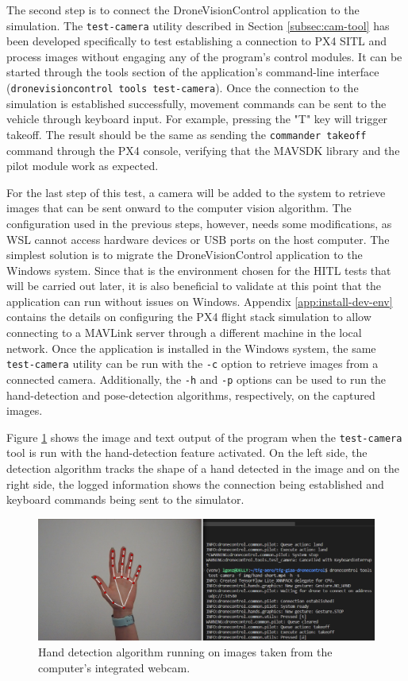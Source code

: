 The second step is to connect the DroneVisionControl application to the simulation.
The \texttt{test-camera} utility described in Section \ref{subsec:cam-tool} has been developed specifically to test establishing a connection to PX4 SITL and process images without engaging any of the program's control modules.
It can be started through the tools section of the application's command-line interface (\texttt{dronevisioncontrol tools test-camera}).
Once the connection to the simulation is established successfully, movement commands can be sent to the vehicle through keyboard input.
For example, pressing the "T" key will trigger takeoff.
The result should be the same as sending the \texttt{commander takeoff} command through the PX4 console, verifying that the MAVSDK library and the pilot module work as expected.



For the last step of this test, a camera will be added to the system to retrieve images that can be sent onward to the computer vision algorithm.
The configuration used in the previous steps, however, needs some modifications, as WSL cannot access hardware devices or USB ports on the host computer.
The simplest solution is to migrate the DroneVisionControl application to the Windows system.
Since that is the environment chosen for the HITL tests that will be carried out later, it is also beneficial to validate at this point that the application can run without issues on Windows.
Appendix \ref{app:install-dev-env} contains the details on configuring the PX4 flight stack simulation to allow connecting to a MAVLink server through a different machine in the local network.
Once the application is installed in the Windows system, the same \texttt{test-camera} utility can be run with the \texttt{-c} option to retrieve images from a connected camera.
Additionally, the \texttt{-h} and \texttt{-p} options can be used to run the hand-detection and pose-detection algorithms, respectively, on the captured images.

Figure \ref{fig:sitl-hand} shows the image and text output of the program when the \texttt{test-camera} tool is run with the hand-detection feature activated.
On the left side, the detection algorithm tracks the shape of a hand detected in the image and on the right side, the logged information shows the connection being established and keyboard commands being sent to the simulator.

\begin{figure}
  \centering
  \includegraphics[width=\textwidth, keepaspectratio]{img/sitl-hand.png}
  \caption{Hand detection algorithm running on images taken from the computer's integrated webcam.}\label{fig:sitl-hand}
\end{figure}

